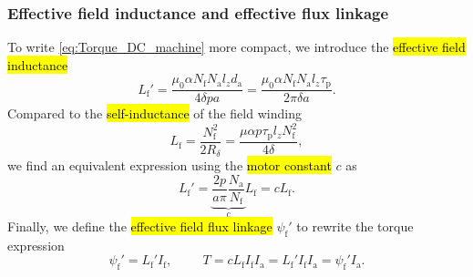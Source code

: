 \begin{frame}
	\frametitle{Effective field inductance and effective flux linkage}
	To write \eqref{eq:Torque_DC_machine} more compact, we introduce the \hl{effective field inductance}
	\begin{equation}
		L_\mathrm{f}' =  \frac{\mu_0 \alpha N_\mathrm{f} N_\mathrm{a} l_z d_\mathrm{a}}{4 \delta p a } = \frac{\mu_0 \alpha N_\mathrm{f} N_\mathrm{a} l_z \tau_\mathrm{p}}{2 \pi  \delta a}.
		\label{eq:Effective_field_inductance}
	\end{equation} \pause
	Compared to the \hl{self-inductance} of the field winding
	\begin{equation}
		L_\mathrm{f} = \frac{N_\mathrm{f}^2}{2 R_\delta} = \frac{\mu  \alpha p \tau_\mathrm{p} l_z N_\mathrm{f}^2}{4 \delta},
	\end{equation} \pause
	we find an equivalent expression using the \hl{motor constant} $c$ as
	\begin{equation}
		L_\mathrm{f}' = \underbrace{\frac{2p}{a \pi}\frac{N_\mathrm{a}}{N_\mathrm{f}}}_{c} L_\mathrm{f}  = c L_\mathrm{f} .
	\end{equation} \pause
	Finally, we define the \hl{effective field flux linkage} $\psi_\mathrm{f}'$ to rewrite the torque expression
	\begin{equation}
		\psi_\mathrm{f}' = L_\mathrm{f}' I_\mathrm{f}, \hspace{1cm} T = c L_\mathrm{f} I_\mathrm{f} I_\mathrm{a} = L_\mathrm{f}' I_\mathrm{f} I_\mathrm{a}  = \psi_\mathrm{f}' I_\mathrm{a}.
		\label{eq:Effective_field_flux_linkage}
	\end{equation}
\end{frame}


